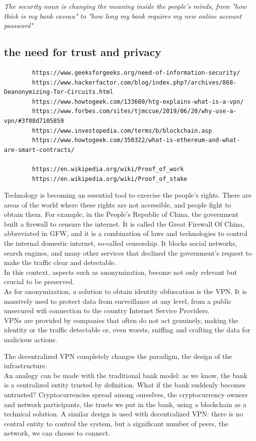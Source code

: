 \documentclass[12pt]{article}
\begin{document}
	\textit{The security noun is changing the meaning inside the people's minds, from "how thick is my bank caveau" to "how long my bank requires my new online account password"}

	\subsection{the need for trust and privacy}

	\begin{verbatim}
		https://www.geeksforgeeks.org/need-of-information-security/
		https://www.hackerfactor.com/blog/index.php?/archives/868-Deanonymizing-Tor-Circuits.html
		https://www.howtogeek.com/133680/htg-explains-what-is-a-vpn/
		https://www.forbes.com/sites/tjmccue/2019/06/20/why-use-a-vpn/#3f08d7105859
		https://www.investopedia.com/terms/b/blockchain.asp
		https://www.howtogeek.com/350322/what-is-ethereum-and-what-are-smart-contracts/
		
		https://en.wikipedia.org/wiki/Proof_of_work
		https://en.wikipedia.org/wiki/Proof_of_stake
	\end{verbatim}

	Technology is becoming an essential tool to exercise the people's rights. There are areas of the world where these rights are not accessible, and people fight to obtain them. For example, in the People's Republic of China, the government built a firewall to censure the internet. It is called the Great Firewall Of China, abbreviated in GFW, and it is a combination of laws and technologies to control the internal domestic internet, so-called censorship. It blocks social networks, search engines, and many other services that declined the government's request to make the traffic clear and detectable.\\
	In this context, aspects such as anonymization, become not only relevant but crucial to be preserved.\\
	As for anonymization, a solution to obtain identity obfuscation is the VPN. It is massively used to protect data from surveillance at any level, from a public unsecured wifi connection to the country Internet Service Providers.\\VPNs are provided by companies that often do not act genuinely, making the identity or the traffic detectable or, even worsts, sniffing and crafting the data for malicious actions.\\
	\bigbreak

	The decentralized VPN completely changes the paradigm, the design of the infrastructure.\\
	An analogy can be made with the traditional bank model: as we know, the bank is a centralized entity trusted by definition. What if the bank suddenly becomes untrusted? Cryptocurrencies spread among ourselves, the cryptocurrency owners and network participants, the trusts we put in the bank, using a blockchain as a technical solution. 
	A similar design is used with decentralized VPN: there is no central entity to control the system, but a significant number of peers, the network, we can choose to connect.
\end{document}
